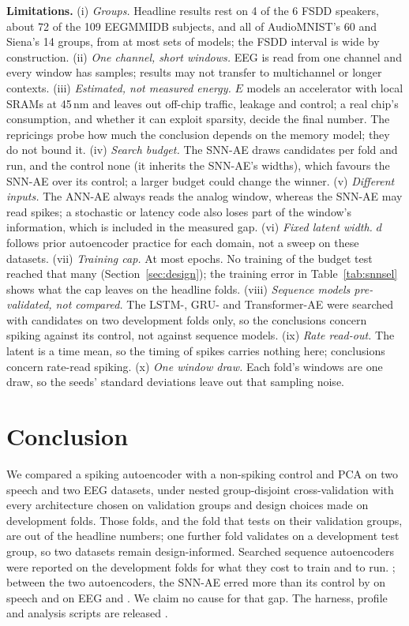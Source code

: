 \documentclass[conference]{IEEEtran}
\begin{document}
\par \textbf{Limitations.}
(i) \emph{Groups.} Headline results rest on 4 of the 6 FSDD speakers, about 72 of the 109
EEGMMIDB subjects, and all of AudioMNIST's 60 and Siena's 14 groups, from at most \cfgFolds{} sets
of models; the FSDD interval is wide by construction. (ii) \emph{One channel, short windows.} EEG is
read from one channel and every window has \cfgWindow{} samples; results may not transfer to
multichannel or longer contexts. (iii) \emph{Estimated, not measured energy.} $E$ models an
accelerator with local SRAMs at 45\,nm and leaves out off-chip traffic, leakage and control;
a real chip's consumption, and whether it can exploit sparsity, decide the final number. The
repricings probe how much the conclusion depends on the memory model; they do not bound it. (iv) \emph{Search budget.} The SNN-AE draws \cfgGaEvals{} candidates per
fold and run, and the control none (it inherits the SNN-AE's widths), which favours the SNN-AE
over its control; a larger budget could change the winner. (v) \emph{Different inputs.} The ANN-AE always reads
the analog window, whereas the SNN-AE may read spikes; a stochastic or latency code also loses
part of the window's information, which is included in the measured gap. (vi) \emph{Fixed latent width.} $d$ follows prior autoencoder practice for
each domain, not a sweep on these datasets. (vii) \emph{Training cap.} At most \cfgEpochs{}
epochs. No training of the budget test reached that many (Section~\ref{sec:design}); the training
error in Table~\ref{tab:snnsel} shows what the cap leaves on the headline folds.
(viii) \emph{Sequence models pre-validated, not compared.} The LSTM-, GRU- and Transformer-AE
were searched with \preGaEvals{} candidates on two development folds only, so the conclusions
concern spiking against its control, not against sequence models. (ix) \emph{Rate read-out.} The
latent is a time mean, so the timing of spikes carries nothing here; conclusions concern
rate-read spiking. (x) \emph{One window draw.} Each fold's windows are one draw, so the seeds' standard
deviations leave out that sampling noise.

\section{Conclusion}
\label{sec:conclusion}

\par We compared a spiking autoencoder with a non-spiking control and PCA on two speech and two
EEG datasets, under nested group-disjoint cross-validation with every architecture chosen on
validation groups and design choices made on development folds. Those folds, and the fold that
tests on their validation groups, are out of the headline numbers; one further fold validates on
a development test group, so two datasets remain design-informed. Searched sequence autoencoders
were reported on the development folds for what they cost to train and to run. \sigPcaVerdict;
between the two autoencoders, the SNN-AE erred more than its control by \sigGapSpeech{} on speech
and \sigGapEeg{} on EEG and \energyVsControl. We claim no cause for that gap. The harness, profile and analysis scripts are released \cite{furlan2026doi}.
\end{document}
